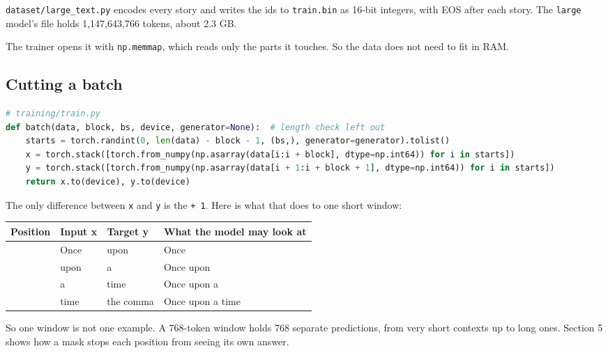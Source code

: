 \documentclass[11pt,a4paper]{article}
\newcommand{\vs}{\textvisiblespace}
\newcommand{\code}[1]{\texttt{#1}}
\begin{document}
\code{dataset/\allowbreak{}large\_\allowbreak{}text.\allowbreak{}py} encodes every story and writes the ids to \code{train.\allowbreak{}bin} as 16-bit integers, with EOS after each story. The \code{large} model's file holds 1,147,643,766 tokens, about 2.3 GB.

The trainer opens it with \code{np.\allowbreak{}memmap}, which reads only the parts it touches. So the data does not need to fit in RAM.

\subsection*{Cutting a batch}
{}

\begin{lstlisting}[language=Python]
# training/train.py
def batch(data, block, bs, device, generator=None):  # length check left out
    starts = torch.randint(0, len(data) - block - 1, (bs,), generator=generator).tolist()
    x = torch.stack([torch.from_numpy(np.asarray(data[i:i + block], dtype=np.int64)) for i in starts])
    y = torch.stack([torch.from_numpy(np.asarray(data[i + 1:i + block + 1], dtype=np.int64)) for i in starts])
    return x.to(device), y.to(device)
\end{lstlisting}

The only difference between \code{x} and \code{y} is the \code{+ 1}. Here is what that does to one short window:

{\small
\begin{longtable}{@{}>{\raggedright\arraybackslash}p{}>{\raggedright\arraybackslash}p{}>{\raggedright\arraybackslash}p{}>{\raggedright\arraybackslash}p{}@{}}
\toprule
\textbf{Position} & \textbf{Input x} & \textbf{Target y} & \textbf{What the model may look at} \\
\midrule
\endhead
0 & Once & \vs{}upon & Once \\
1 & \vs{}upon & \vs{}a & Once upon \\
2 & \vs{}a & \vs{}time & Once upon a \\
3 & \vs{}time & the comma & Once upon a time \\
\bottomrule
\end{longtable}
}

So one window is not one example. A 768-token window holds 768 separate predictions, from very short contexts up to long ones. Section 5 shows how a mask stops each position from seeing its own answer.
\end{document}

